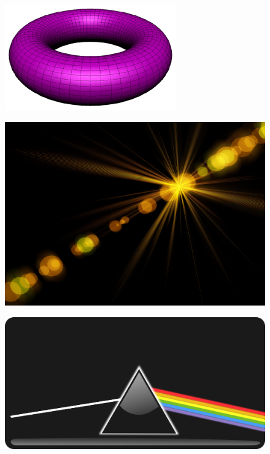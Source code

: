 {
	\begin{figure}
		\centering
			\includegraphics[width=\textwidth, height=0.2\textheight, keepaspectratio]{images/primitive_torus}
	\end{figure}
	\begin{figure}
		\centering
		\includegraphics[width=\textwidth, height=0.2\textheight, keepaspectratio]{images/bokeh-419869}
	\end{figure}
	\begin{figure}
		\centering
		\includegraphics[width=\textwidth, height=0.2\textheight, keepaspectratio]{images/refraction-150853}
	\end{figure}
}

